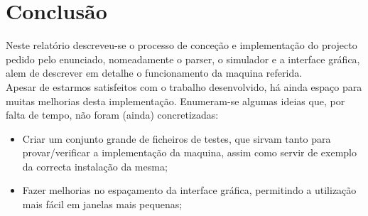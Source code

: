 \documentclass{report}
\begin{document}
\chapter{Conclusão} \label{concl}
\quad Neste relatório descreveu-se o processo de conceção e implementação do projecto pedido pelo
enunciado, nomeadamente o parser, o simulador e a interface gráfica, alem de descrever em detalhe
o funcionamento da maquina referida.\\
\null\quad Apesar de estarmos satisfeitos com o trabalho desenvolvido, há ainda espaço para muitas
melhorias desta implementação. Enumeram-se algumas ideias que, por falta de tempo, não foram
(ainda) concretizadas:

\begin{itemize}
\item Criar um conjunto grande de ficheiros de testes, que sirvam tanto para provar/verificar a
implementação da maquina, assim como servir de exemplo da correcta instalação da mesma;
\item Fazer melhorias no espaçamento da interface gráfica, permitindo a utilização mais fácil em janelas mais pequenas;
\end{itemize}



\end{document}
